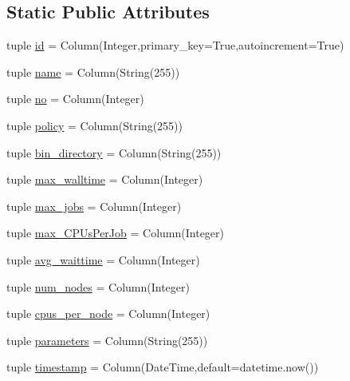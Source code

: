 \subsection*{\-Static \-Public \-Attributes}
\begin{DoxyCompactItemize}
\item 
tuple \hyperlink{classcyberweb_1_1model_1_1queue_1_1_queue_info_a47cd230546b8dfadb55fccf2c122949b}{id} = \-Column(\-Integer,primary\-\_\-key=\-True,autoincrement=\-True)
\item 
tuple \hyperlink{classcyberweb_1_1model_1_1queue_1_1_queue_info_ae69b46ad81e2651e7cc95105c95981de}{name} = \-Column(\-String(255))
\item 
tuple \hyperlink{classcyberweb_1_1model_1_1queue_1_1_queue_info_ae44897a17998300506cda4cf8a62ad0b}{no} = \-Column(\-Integer)
\item 
tuple \hyperlink{classcyberweb_1_1model_1_1queue_1_1_queue_info_a26f38de1bf1e31ee5a691bde93c5daaf}{policy} = \-Column(\-String(255))
\item 
tuple \hyperlink{classcyberweb_1_1model_1_1queue_1_1_queue_info_aba1261a175b5624b5dc9b4ceeeedaccb}{bin\-\_\-directory} = \-Column(\-String(255))
\item 
tuple \hyperlink{classcyberweb_1_1model_1_1queue_1_1_queue_info_a339dbe8ab205ed17246570e82b8ed26c}{max\-\_\-walltime} = \-Column(\-Integer)
\item 
tuple \hyperlink{classcyberweb_1_1model_1_1queue_1_1_queue_info_a249ab27d53d954d3040ec38b1f4896b8}{max\-\_\-jobs} = \-Column(\-Integer)
\item 
tuple \hyperlink{classcyberweb_1_1model_1_1queue_1_1_queue_info_a17942945a44563b1164fd8b41b9c3258}{max\-\_\-\-C\-P\-Us\-Per\-Job} = \-Column(\-Integer)
\item 
tuple \hyperlink{classcyberweb_1_1model_1_1queue_1_1_queue_info_a40fa36b4c1ba1d6f762b18167b2daacd}{avg\-\_\-waittime} = \-Column(\-Integer)
\item 
tuple \hyperlink{classcyberweb_1_1model_1_1queue_1_1_queue_info_a0a96cf642f277feb810fc1b75e0ed222}{num\-\_\-nodes} = \-Column(\-Integer)
\item 
tuple \hyperlink{classcyberweb_1_1model_1_1queue_1_1_queue_info_afaadad59783bbd0bf005cc23f25144a8}{cpus\-\_\-per\-\_\-node} = \-Column(\-Integer)
\item 
tuple \hyperlink{classcyberweb_1_1model_1_1queue_1_1_queue_info_ab93f7708be8c0fa1f0572d55b72fdba5}{parameters} = \-Column(\-String(255))
\item 
tuple \hyperlink{classcyberweb_1_1model_1_1queue_1_1_queue_info_aa76dd6d961300cf2f4cf04523a05e17b}{timestamp} = \-Column(\-Date\-Time,default=datetime.\-now())
\end{DoxyCompactItemize}



